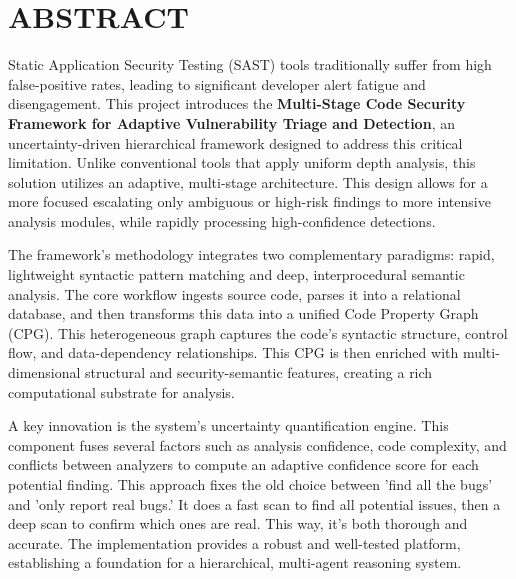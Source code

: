 \documentclass[a4paper, 12pt]{extreport}
\begin{document}
\thispagestyle{empty}
\chapter*{\LARGE ABSTRACT}                                       %
\doublespacing
Static Application Security Testing (SAST) tools traditionally suffer from high false-positive rates, leading to significant developer alert fatigue and disengagement. This project introduces the \textbf{Multi-Stage Code Security Framework for Adaptive Vulnerability Triage and Detection}, an uncertainty-driven hierarchical framework designed to address this critical limitation. Unlike conventional tools that apply uniform depth analysis, this solution  utilizes an adaptive, multi-stage architecture. This design allows for a more focused escalating only ambiguous or high-risk findings to more intensive analysis modules, while rapidly processing high-confidence detections.

\indent The framework's methodology integrates two complementary paradigms: rapid, lightweight syntactic pattern matching and deep, interprocedural semantic analysis. The core workflow ingests source code, parses it into a relational database, and then transforms this data into a unified Code Property Graph (CPG). This heterogeneous graph captures the code's syntactic structure, control flow, and data-dependency relationships. This CPG is then enriched with multi-dimensional structural and security-semantic features, creating a rich computational substrate for analysis.

\indent A key innovation is the system's uncertainty quantification engine. This component fuses several factors such as analysis confidence, code complexity, and conflicts between analyzers to compute an adaptive confidence score for each potential finding. This approach fixes the old choice between 'find all the bugs' and 'only report real bugs.' It does a fast scan to find all potential issues, then a deep scan to confirm which ones are real. This way, it's both thorough and accurate.
The implementation provides a robust and well-tested platform, establishing a foundation for a hierarchical, multi-agent reasoning system.


\setcounter{page}{1}
\end{document}
